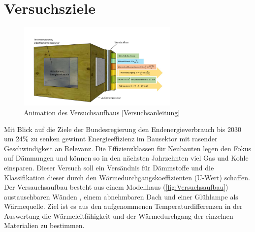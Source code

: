 \section{Versuchsziele}
\begin{figure}[!h]
		\centering
		\includegraphics[width=0.7\textwidth]{Abbildungen/Thurow_Deckblatt}
		\caption{Animation des Versuchsaufbaus [Versuchsanleitung] }
		\label{fig:Versuchsaufbau}
\end{figure}

Mit Blick auf die Ziele der Bundesregierung den Endenergieverbrauch bis 2030 um 24\% zu senken gewinnt Energieeffizienz im Bausektor mit rasender Geschwindigkeit an Relevanz. Die Effizienzklassen für Neubauten legen den Fokus auf Dämmungen und können so in den nächsten Jahrzehnten viel Gas und Kohle einsparen. Dieser Versuch soll ein Versändnis für Dämmstoffe und die Klassifikation dieser durch den Wärmedurchgangskoeffizienten (U-Wert) schaffen.  Der Versauchsaufbau besteht aus einem Modellhaus (\autoref{fig:Versuchsaufbau}) austauschbaren Wänden , einem abnehmbaren Dach und einer Glühlampe als Wärmequelle. Ziel ist es aus den aufgenommenen Temperaturdifferenzen in der Auswertung die Wärmeleitfähigkeit und der Wärmedurchgang der einzelnen Materialien zu bestimmen.